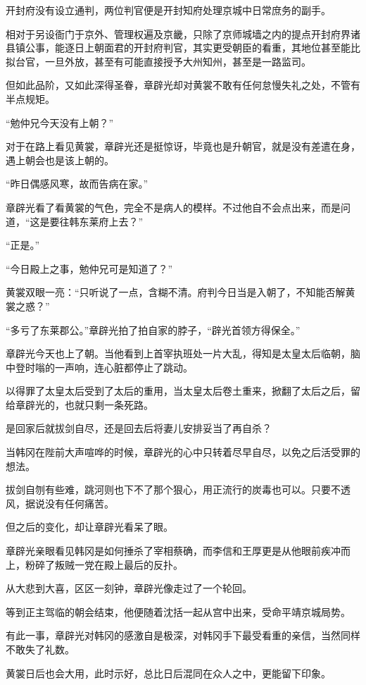 开封府没有设立通判，两位判官便是开封知府处理京城中日常庶务的副手。

相对于另设衙门于京外、管理权遍及京畿，只除了京师城墙之内的提点开封府界诸县镇公事，能逐日上朝面君的开封府判官，其实更受朝臣的看重，其地位甚至能比拟台官，一旦外放，甚至有可能直接授予大州知州，甚至是一路监司。

但如此品阶，又如此深得圣眷，章辟光却对黄裳不敢有任何怠慢失礼之处，不管有半点规矩。

“勉仲兄今天没有上朝？”

对于在路上看见黄裳，章辟光还是挺惊讶，毕竟也是升朝官，就是没有差遣在身，遇上朝会也是该上朝的。

“昨日偶感风寒，故而告病在家。”

章辟光看了看黄裳的气色，完全不是病人的模样。不过他自不会点出来，而是问道，“这是要往韩东莱府上去？”

“正是。”

“今日殿上之事，勉仲兄可是知道了？”

黄裳双眼一亮：“只听说了一点，含糊不清。府判今日当是入朝了，不知能否解黄裳之惑？”

“多亏了东莱郡公。”章辟光拍了拍自家的脖子，“辟光首领方得保全。”

章辟光今天也上了朝。当他看到上首宰执班处一片大乱，得知是太皇太后临朝，脑中登时嗡的一声响，连心脏都停止了跳动。

以得罪了太皇太后受到了太后的重用，当太皇太后卷土重来，掀翻了太后之后，留给章辟光的，也就只剩一条死路。

是回家后就拔剑自尽，还是回去后将妻儿安排妥当了再自杀？

当韩冈在陛前大声喧哗的时候，章辟光的心中只转着尽早自尽，以免之后活受罪的想法。

拔剑自刎有些难，跳河则也下不了那个狠心，用正流行的炭毒也可以。只要不透风，据说没有任何痛苦。

但之后的变化，却让章辟光看呆了眼。

章辟光亲眼看见韩冈是如何捶杀了宰相蔡确，而李信和王厚更是从他眼前疾冲而上，粉碎了叛贼一党在殿上最后的反扑。

从大悲到大喜，区区一刻钟，章辟光像走过了一个轮回。

等到正主驾临的朝会结束，他便随着沈括一起从宫中出来，受命平靖京城局势。

有此一事，章辟光对韩冈的感激自是极深，对韩冈手下最受看重的亲信，当然同样不敢失了礼数。

黄裳日后也会大用，此时示好，总比日后混同在众人之中，更能留下印象。
